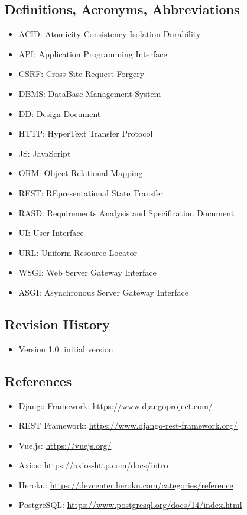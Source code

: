 \documentclass[table, 12pt]{article}
\begin{document}
\subsection{Definitions, Acronyms, Abbreviations}
\begin{itemize}
    \item ACID: Atomicity-Consistency-Isolation-Durability
    \item API: Application Programming Interface
    \item CSRF: Cross Site Request Forgery
    \item DBMS: DataBase Management System
    \item DD: Design Document
    \item HTTP: HyperText Transfer Protocol
    \item JS: JavaScript
    \item ORM: Object-Relational Mapping
    \item REST: REpresentational State Transfer
    \item RASD: Requirements Analysis and Specification Document
    \item UI: User Interface
    \item URL: Uniform Resource Locator
    \item WSGI: Web Server Gateway Interface
    \item ASGI: Asynchronous Server Gateway Interface
\end{itemize}
\subsection{Revision History}
\begin{itemize}
    \item Version 1.0: initial version
\end{itemize}
\subsection{References}
\begin{itemize}
    \item Django Framework: \url{https://www.djangoproject.com/}
    \item REST Framework: \url{https://www.django-rest-framework.org/}
    \item Vue.js: \url{https://vuejs.org/}
    \item Axios: \url{https://axios-http.com/docs/intro}
    \item Heroku: \url{https://devcenter.heroku.com/categories/reference}
    \item PostgreSQL: \url{https://www.postgresql.org/docs/14/index.html}
\end{itemize}
\end{document}
